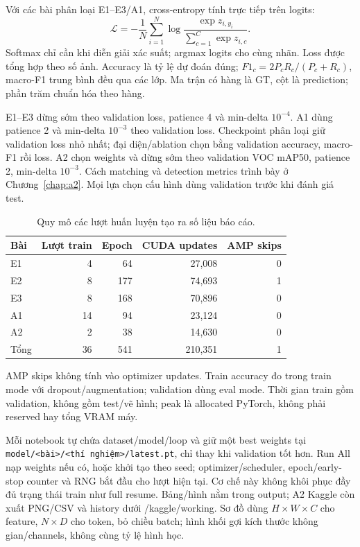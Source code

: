 \documentclass[12pt,a4paper,oneside]{report}
\begin{document}
Với các bài phân loại E1--E3/A1, cross-entropy tính trực tiếp trên logits:
\begin{equation}
\mathcal L=-\frac1 N\sum_{i=1}^N
\log\frac{\exp z_{i,y_i}}{\sum_{c=1}^C\exp z_{i,c}}.
\end{equation}
Softmax chỉ cần khi diễn giải xác suất; argmax logits cho cùng nhãn.
Loss được tổng hợp theo số ảnh. Accuracy là tỷ lệ dự đoán đúng;
$F1_c=2 P_cR_c/(P_c+R_c)$, macro-F1 trung bình đều qua các lớp.
Ma trận có hàng là GT, cột là prediction; phần trăm chuẩn hóa theo hàng.

E1--E3 dừng sớm theo validation loss, patience 4 và min-delta $10^{-4}$.
A1 dùng patience 2 và min-delta $10^{-3}$ theo validation loss.
Checkpoint phân loại giữ validation loss nhỏ nhất; đại diện/ablation
chọn bằng validation accuracy, macro-F1 rồi loss. A2 chọn weights và
dừng sớm theo validation VOC mAP50, patience 2, min-delta $10^{-3}$.
Cách matching và detection metrics trình bày ở Chương~\ref{chap:a2}.
Mọi lựa chọn cấu hình dùng validation trước khi đánh giá test.

\begin{table}[H]\centering\caption{Quy mô các lượt huấn luyện tạo ra số liệu báo cáo.}
\begin{tabular}{lrrrr}\toprule
Bài & Lượt train & Epoch & CUDA updates & AMP skips\\\midrule
E1 &4&64&27,008&0\\
E2 &8&177&74,693&1\\
E3 &8&168&70,896&0\\
A1 &14&94&23,124&0\\
A2 &2&38&14,630&0\\\midrule
Tổng &36&541&210,351&1\\\bottomrule
\end{tabular}\label{table:main-3}
\end{table}
AMP skips không tính vào optimizer updates. Train accuracy đo trong train
mode với dropout/augmentation; validation dùng eval mode. Thời gian train
gồm validation, không gồm test/vẽ hình; peak là allocated PyTorch,
không phải reserved hay tổng VRAM máy.

Mỗi notebook tự chứa dataset/model/loop và giữ một best weights tại
\texttt{model/<bài>/<thí nghiệm>/latest.pt}, chỉ thay khi validation tốt hơn.
Run All nạp weights nếu có, hoặc khởi tạo theo seed; optimizer/scheduler,
epoch/early-stop counter và RNG bắt đầu cho lượt hiện tại. Cơ chế này không
khôi phục đầy đủ trạng thái train như full resume. Bảng/hình nằm trong output;
A2 Kaggle còn xuất PNG/CSV và history dưới /kaggle/working.
Sơ đồ dùng $H\times W\times C$ cho feature, $N\times D$ cho token, bỏ chiều
batch; hình khối gợi kích thước không gian/channels, không cùng tỷ lệ hình học.
\end{document}
